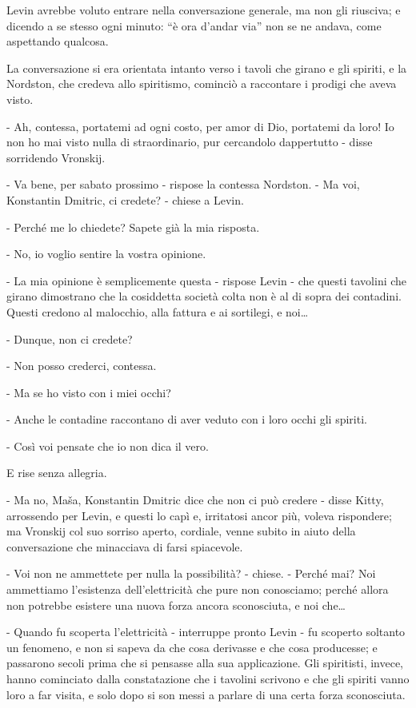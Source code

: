 Levin avrebbe voluto entrare nella conversazione generale, ma non gli riusciva; e dicendo a se stesso ogni minuto: ``è ora d'andar via'' non se ne andava, come aspettando qualcosa. 

La conversazione si era orientata intanto verso i tavoli che girano e gli spiriti, e la Nordston, che credeva allo spiritismo, cominciò a raccontare i prodigi che aveva visto. 

- Ah, contessa, portatemi ad ogni costo, per amor di Dio, portatemi da loro! Io non ho mai visto nulla di straordinario, pur cercandolo dappertutto - disse sorridendo Vronskij. 

- Va bene, per sabato prossimo - rispose la contessa Nordston. - Ma voi, Konstantin Dmitric, ci credete? - chiese a Levin. 

- Perché me lo chiedete? Sapete già la mia risposta. 

- No, io voglio sentire la vostra opinione. 

- La mia opinione è semplicemente questa - rispose Levin - che questi tavolini che girano dimostrano che la cosiddetta società colta non è al di sopra dei contadini. Questi credono al malocchio, alla fattura e ai sortilegi, e noi\ldots{} 

- Dunque, non ci credete? 

- Non posso crederci, contessa. 

- Ma se ho visto con i miei occhi? 

- Anche le contadine raccontano di aver veduto con i loro occhi gli spiriti. 

- Così voi pensate che io non dica il vero. 

E rise senza allegria. 

- Ma no, Maša, Konstantin Dmitric dice che non ci può credere - disse Kitty, arrossendo per Levin, e questi lo capì e, irritatosi ancor più, voleva rispondere; ma Vronskij col suo sorriso aperto, cordiale, venne subito in aiuto della conversazione che minacciava di farsi spiacevole. 

- Voi non ne ammettete per nulla la possibilità? - chiese. - Perché mai? Noi ammettiamo l'esistenza dell'elettricità che pure non conosciamo; perché allora non potrebbe esistere una nuova forza ancora sconosciuta, e noi che\ldots{} 

- Quando fu scoperta l'elettricità - interruppe pronto Levin - fu scoperto soltanto un fenomeno, e non si sapeva da che cosa derivasse e che cosa producesse; e passarono secoli prima che si pensasse alla sua applicazione. Gli spiritisti, invece, hanno cominciato dalla constatazione che i tavolini scrivono e che gli spiriti vanno loro a far visita, e solo dopo si son messi a parlare di una certa forza sconosciuta. 

